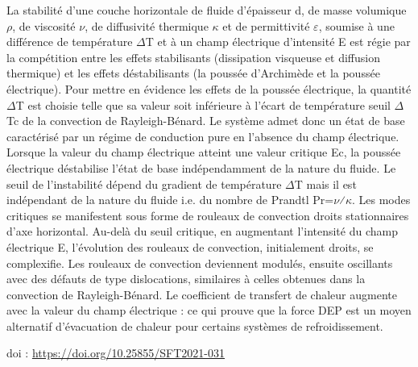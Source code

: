 {La stabilité d'une couche horizontale de fluide d'épaisseur d, de masse volumique $\rho$, de viscosité $\nu$, de diffusivité thermique $\kappa$ et de permittivité $\varepsilon$, soumise à une différence de température $\Delta$T et à un champ électrique d'intensité E est régie par la compétition entre les effets stabilisants (dissipation visqueuse et diffusion thermique) et les effets déstabilisants (la poussée d'Archimède et la poussée électrique). Pour mettre en évidence les effets de la poussée électrique, la quantité $\Delta$T est choisie telle que sa valeur soit inférieure à l'écart de température seuil $\Delta$Tc de la convection de Rayleigh-Bénard. Le système admet donc un état de base caractérisé par un régime de conduction pure en l'absence du champ électrique. Lorsque la valeur du champ électrique atteint une valeur critique Ec, la poussée électrique déstabilise l'état de base indépendamment de la nature du fluide. Le seuil de l'instabilité dépend du gradient de température $\Delta$T mais il est indépendant de la nature du fluide i.e. du nombre de Prandtl Pr=$\nu$⁄$\kappa$. Les modes critiques se manifestent sous forme de rouleaux de convection droits stationnaires d'axe horizontal. Au-delà du seuil critique, en augmentant l'intensité du champ électrique E, l'évolution des rouleaux de convection, initialement droits, se complexifie. Les rouleaux de convection deviennent modulés, ensuite oscillants avec des défauts de type dislocations, similaires à celles obtenues dans la convection de Rayleigh-Bénard. Le coefficient de transfert de chaleur augmente avec la valeur du champ électrique : ce qui prouve que la force DEP est un moyen alternatif d'évacuation de chaleur pour certains systèmes de refroidissement.

 \vfill doi : \url{https://doi.org/10.25855/SFT2021-031}

}
 
